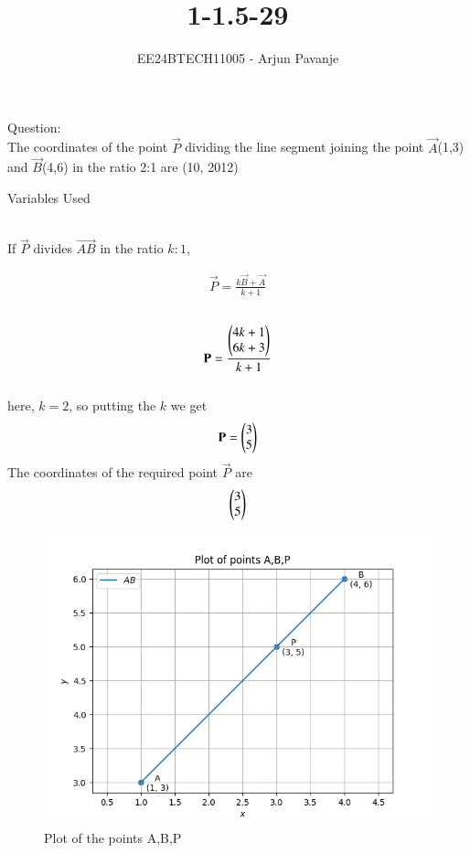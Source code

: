 \documentclass[journal]{IEEEtran}
\begin{document}

\vspace{3cm}

\title{1-1.5-29}
\author{EE24BTECH11005 - Arjun Pavanje
}
{\let\newpage\relax\maketitle}
Question:\\
The coordinates of the point $\vec{P}$ dividing the line segment joining the point $\vec{A}$(1,3) and $\vec{B}$(4,6) in the ratio 2:1 are
\hfill (10, 2012)
\\
\solution
\begin{table}[h!]    
  \centering
  
  \caption{Variables Used}
  \label{tab1-1.5-29}
\end{table}\\
If $\vec{P}$ divides $\vec{AB}$ in the ratio $k:1$,


\begin{align} 
	\vec{P}=\frac{k\vec{B}+\vec{A}}{k+1} 
\end{align}\\
\begin{align}
	\mathbf{P} = \frac{\begin{pmatrix}
4k+1 \\
6k+3
\end{pmatrix}}{k+1} 
\end{align}\\
here, $k = 2$, so putting the $k$ we get
\begin{align}
	\mathbf{P} = 
\begin{pmatrix}
3\\
5
\end{pmatrix}
\end{align}
The coordinates of the required point $\vec{P}$ are
\begin{align}
\begin{pmatrix}
3\\
5
\end{pmatrix}
\end{align}
\begin{figure}[h!]
   \centering
   \includegraphics[width=0.7\linewidth]{figs/Figure_1.png}
   \caption{Plot of the points A,B,P}
   \label{stemplot}
\end{figure}
\end{document}
